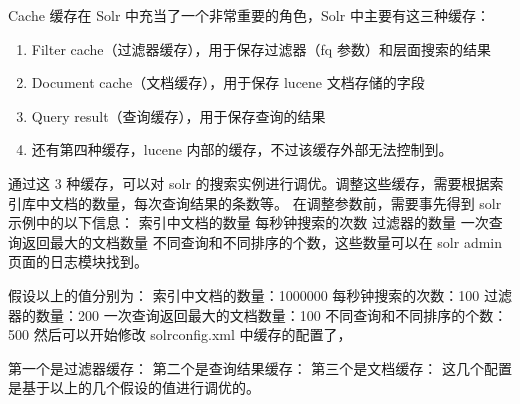 \documentclass[presentation]{beamer}
\begin{document}
\begin{frame}[label={sec:orge918d9b}]{Cache}
缓存在 Solr 中充当了一个非常重要的角色，Solr 中主要有这三种缓存：
\begin{enumerate}
\item Filter cache（过滤器缓存），用于保存过滤器（fq 参数）和层面搜索的结果
\item Document cache（文档缓存），用于保存 lucene 文档存储的字段
\item Query result（查询缓存），用于保存查询的结果
\item 还有第四种缓存，lucene 内部的缓存，不过该缓存外部无法控制到。
\end{enumerate}

通过这 3 种缓存，可以对 solr 的搜索实例进行调优。调整这些缓存，需要根据索引库中文档的数量，每次查询结果的条数等。
在调整参数前，需要事先得到 solr 示例中的以下信息： 索引中文档的数量 每秒钟搜索的次数 过滤器的数量 一次查询返回最大的文档数量
不同查询和不同排序的个数，这些数量可以在 solr admin 页面的日志模块找到。

假设以上的值分别为：
索引中文档的数量：1000000
每秒钟搜索的次数：100
过滤器的数量：200
一次查询返回最大的文档数量：100
不同查询和不同排序的个数：500
然后可以开始修改 solrconfig.xml 中缓存的配置了，



第一个是过滤器缓存：
第二个是查询结果缓存：
第三个是文档缓存：
这几个配置是基于以上的几个假设的值进行调优的。
\end{frame}
\end{document}
